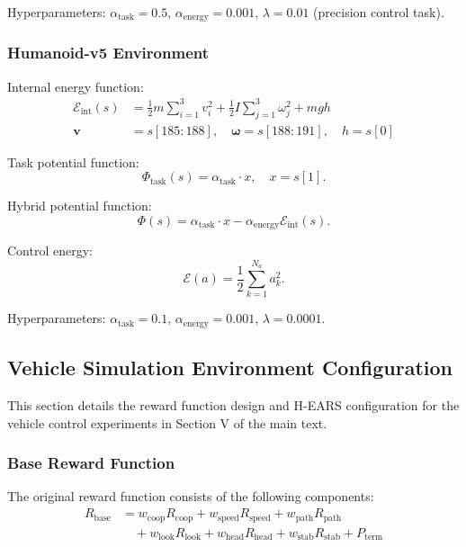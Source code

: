 \documentclass[journal]{IEEEtran}
\begin{document}
	Hyperparameters: $\alpha_{\text{task}}=0.5$, $\alpha_{\text{energy}}=0.001$, $\lambda=0.01$ (precision control task).
	
	\subsubsection{Humanoid-v5 Environment}
	
	Internal energy function:
	\begin{equation}
		\begin{aligned}
			\mathcal{E}_{\text{int}}(s) &= \frac{1}{2}m\sum_{i=1}^{3}v_i^2 + \frac{1}{2}I\sum_{j=1}^{3}\omega_j^2 + mgh \\
			\mathbf{v} &= s[185:188], \quad \boldsymbol{\omega} = s[188:191], \quad h = s[0]
		\end{aligned}
	\end{equation}
	
	Task potential function:
	\begin{equation}
		\Phi_{\text{task}}(s) = \alpha_{\text{task}} \cdot x, \quad x = s[1].
	\end{equation}
	
	Hybrid potential function:
	\begin{equation}
		\Phi(s) = \alpha_{\text{task}} \cdot x - \alpha_{\text{energy}}\mathcal{E}_{\text{int}}(s).
	\end{equation}
	
	Control energy:
	\begin{equation}
		\mathcal{E}(a) = \frac{1}{2}\sum_{k=1}^{N_a}a_k^2.
	\end{equation}
	
	Hyperparameters: $\alpha_{\text{task}}=0.1$, $\alpha_{\text{energy}}=0.001$, $\lambda=0.0001$.
	
	\subsection{Vehicle Simulation Environment Configuration}
	\label{app:vehicle}
	
	This section details the reward function design and H-EARS configuration for the vehicle control experiments in Section V of the main text.
	
	\subsubsection{Base Reward Function}
	
	The original reward function consists of the following components:
	\begin{equation}
		\begin{aligned}
			R_{\text{base}} &= w_{\text{coop}}R_{\text{coop}} + w_{\text{speed}}R_{\text{speed}} + w_{\text{path}}R_{\text{path}} \\
			&\quad + w_{\text{look}}R_{\text{look}} + w_{\text{head}}R_{\text{head}} + w_{\text{stab}}R_{\text{stab}} + P_{\text{term}}
		\end{aligned}
	\end{equation}
	
\end{document}

